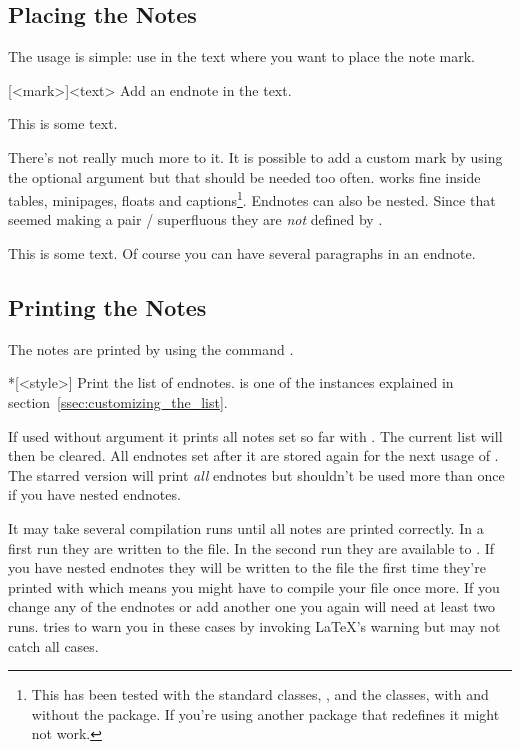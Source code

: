 \documentclass[toc=bib,toc=index]{cnpkgdoc}
\begin{document}
\subsection{Placing the Notes}
The usage is simple: use  in the text where you want to place the
note mark.
\begin{beschreibung}
 [<mark>]{<text>} Add an endnote in the text.
\end{beschreibung}
\begin{beispiel}
 This is some text.
\end{beispiel}
There's not really much more to it. It is possible to add a custom mark by
using the optional argument but that should be needed too often. 
works fine inside tables, minipages, floats and captions\footnote{This has been
tested with the standard classes, , and the 
classes, with and without the  package. If you're using another
package that redefines  it might not work.}. Endnotes can also be
nested. Since that seemed making a pair /
superfluous they are \emph{not} defined by \enotez.
\begin{beispiel}
 This is some text.
 Of course you can have several paragraphs\endnote{\kant[1-3]} in an endnote.
\end{beispiel}

\subsection{Printing the Notes}
The notes are printed by using the command .
\begin{beschreibung}
 *[<style>] Print the list of endnotes.  is
   one of the instances explained in section~\ref{ssec:customizing_the_list}.
\end{beschreibung}
If used without argument it prints all notes set so far with . The
current list will then be cleared. All endnotes set after it are stored again
for the next usage of . The starred version will print
\emph{all} endnotes but shouldn't be used more than once if you have nested
endnotes.

It may take several compilation runs until all notes are printed correctly. In
a first run they are written to the  file. In the second run they are
available to . If you have nested endnotes they will be written
to the  file the first time they're printed with 
which means you might have to compile your file once more. If you change any of
the endnotes or add another one you again will need at least two runs. \enotez
tries to warn you in these cases by invoking \LaTeX's warning
but may not catch all cases.
\end{document}
